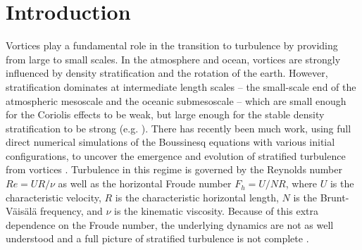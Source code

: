 \chapter{Introduction}



Vortices play a fundamental role in the transition to turbulence by providing  from large to small scales. In the atmosphere and ocean, vortices are strongly influenced by density stratification and the rotation of the earth. However, stratification dominates at intermediate length scales -- the small-scale end of the atmospheric mesoscale and the oceanic submesoscale --  which are small enough for the Coriolis effects to be weak, but large enough for the stable density stratification to be strong (e.g. \cite{riley2003,rileylindborg2013,waitebartello2004}).  There has recently been much work, using full direct numerical simulations of the Boussinesq equations with various initial configurations, to uncover the emergence and evolution of stratified turbulence from vortices \cite{augierbillant2011,augier2012,delonclebc2008,waitesmol2008}. Turbulence in this regime is governed by the Reynolds number $Re=UR/\nu$ as well as the horizontal Froude number $F_{h}=U/NR$, where $U$ is the characteristic velocity, $R$ is the characteristic horizontal length, $N$ is the Brunt-V\"{a}is\"{a}l\"{a} frequency, and $\nu$ is the kinematic viscosity. Because of this extra dependence on the Froude number, the underlying dynamics are not as well understood and a full picture of stratified turbulence is not complete \cite{lindborg2006,riley2003,rileylelong2000,rileylindborg2013,waitebartello2004}.  

